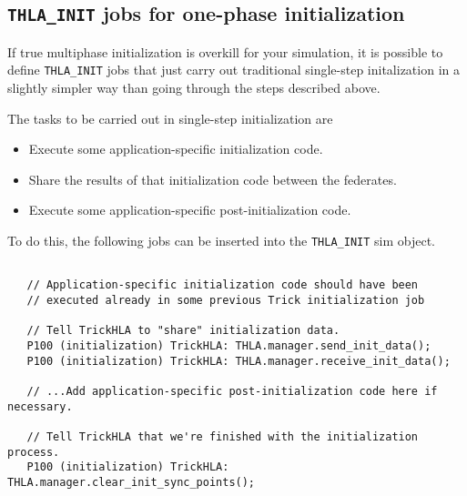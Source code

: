 \subsection{{\tt THLA\_INIT} jobs for one-phase initialization}

If true multiphase initialization is overkill for your simulation,
it is possible to define {\tt THLA\_INIT} jobs that just carry out
traditional single-step initalization in a slightly simpler way
than going through the steps described above.

The tasks to be carried out in single-step initialization are
\begin{itemize}
\item{
  Execute some application-specific initialization code.
}
\item{
  Share the results of that initialization code between the federates.
}
\item{
  Execute some application-specific post-initialization code.
}
\end{itemize}

To do this, the following jobs can be inserted into the {\tt THLA\_INIT}
sim object.

\begin{lstlisting}[caption={One-phase initialization jobs}]

   // Application-specific initialization code should have been
   // executed already in some previous Trick initialization job

   // Tell TrickHLA to "share" initialization data.
   P100 (initialization) TrickHLA: THLA.manager.send_init_data();
   P100 (initialization) TrickHLA: THLA.manager.receive_init_data();

   // ...Add application-specific post-initialization code here if necessary.

   // Tell TrickHLA that we're finished with the initialization process.
   P100 (initialization) TrickHLA: THLA.manager.clear_init_sync_points();
\end{lstlisting}



